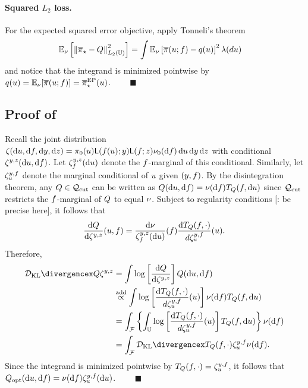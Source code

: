 \documentclass[12pt]{article}
\begin{document}
\paragraph{Squared $L_2$ loss.} 
For the expected squared error objective, apply Tonneli's theorem 
\begin{align}
\mathbb{E}_{\nu}\left[\left\lVert{\overline{\pi}}_{\star} - Q\right\rVert^2_{L_2(\mathbb{U})} \right]
&= \int \mathbb{E}_{\nu} \left[\overline{\pi}(u; f) - q(u) \right]^2 \lambda(du) \nonumber
\end{align}
and notice that the integrand is minimized pointwise by
$q(u) = \mathbb{E}_{\nu}[\overline{\pi}(u; f)] = {\overline{\pi}}_{\star}^{\mathrm{EP}}(u)$. $\qquad \blacksquare$
 
\subsection{Proof of }
Recall the joint distribution 
$\jointKOH(\d\Par, \d\targetTraj, \d\obs, \d\emObs) =
\priorDens(\Par) \lik(\targetTraj(\Par); \obs) \lik(\targetTraj; \emObs) 
\emDistPrior(\d\targetTraj) \, \d\Par \, \d\obs \, \d\emObs$
with conditional $\postKOH(\d\Par, \d\targetTraj)$.
Let $\postKOH_{\targetTraj}(\d\Par)$ denote the $f$-marginal of this conditional.
Similarly, let $\zeta^{y,f}_{u}$ denote the marginal conditional of 
$u$ given $(y,f)$.
By the disintegration theorem, any $Q \in \mathcal{Q}_{\mathrm{cut}}$ can be written as 
$\qMeas(\d\Par, \d\targetTraj) = \emDist(\d\targetTraj) \qCond(\targetTraj, \d\Par)$ since 
$\mathcal{Q}_{\mathrm{cut}}$ restricts the $f$-marginal of $Q$ to equal $\nu$.
Subject to regularity conditions [\todo: be precise here], it follows that
\begin{equation}
\frac{\d\qMeas}{\d\postKOH}(\Par, \targetTraj) =
\frac{\d\emDist}{\postKOH_{\targetTraj}(\d\Par)}(\targetTraj)
\frac{\d\qCond(\targetTraj,\cdot)}{d\condMargKOH}(\Par).
\end{equation}
Therefore,
\begin{align*}
\KL{\qMeas}{\postKOH} 
&= \int \log \left[\frac{\d\qMeas}{\d\postKOH}\right] \qMeas(\d\Par, \d\targetTraj) \\
&\proptoAdd \int \log \left[\frac{\d\qCond(\targetTraj,\cdot)}{d\condMargKOH}(\Par)\right] \emDist(\d\targetTraj) \qCond(\targetTraj,\d\Par) \\
&= \int_{\emSpace} \left\{\int_{\parSpace}  
\log \left[\frac{\d\qCond(\targetTraj,\cdot)}{d\condMargKOH}(\Par)\right] \qCond(\targetTraj,\d\Par) \right\} \emDist(\d\targetTraj) \\
&= \int_{\emSpace} \KL{\qCond(\targetTraj,\cdot)}{\condMargKOH} \emDist(\d\targetTraj).
\end{align*}
Since the integrand is minimized pointwise by $T_{Q}(f,\cdot) = \zeta^{y,f}_{u}$, it follows that
$\qMeasOpt(\d\Par, \d\targetTraj) = \emDist(\d\targetTraj)\condMargKOH(\d\Par)$. $\qquad \blacksquare$
 
\end{document}

